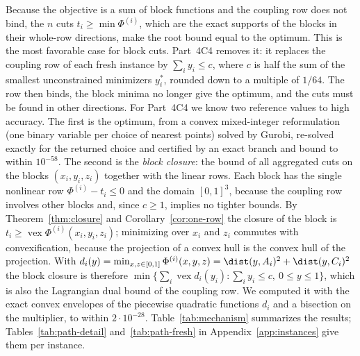 Because the objective is a sum of block functions and the coupling row does not
bind, the $n$ cuts $t_i\ge\min\Phi^{(i)}$, which are the exact supports of the
blocks in their whole-row directions, make the root bound equal to the
optimum. This is the most favorable case for block cuts. Part~4C4 removes it:
it replaces the coupling row of each fresh instance by $\sum_iy_i\le c$, where
$c$ is half the sum of the smallest unconstrained minimizers $y_i^\ast$, rounded
down to a multiple of $1/64$. The row then binds, the block minima no longer
give the optimum, and the cuts must be found in other directions. For Part~4C4
we know two reference values to high accuracy. The first is the optimum, from
a convex mixed-integer reformulation (one binary variable per choice of nearest
points) solved by Gurobi, re-solved exactly for the returned choice and
certified by an exact branch and bound to within $10^{-58}$. The second is the
\emph{block closure}: the bound of all aggregated cuts on the blocks
$(x_i,y_i,z_i)$ together with the linear rows. Each block has the single
nonlinear row $\Phi^{(i)}-t_i\le0$ and the domain $[0,1]^3$, because the coupling
row involves other blocks and, since $c\ge1$, implies no tighter bounds. By
Theorem~\ref{thm:closure} and Corollary~\ref{cor:one-row} the closure of the
block is $t_i\ge\operatorname{vex}\Phi^{(i)}(x_i,y_i,z_i)$; minimizing over $x_i$
and $z_i$ commutes with convexification, because the projection of a convex
hull is the convex hull of the projection. With
$d_i(y)=\min_{x,z\in[0,1]}\Phi^{(i)}(x,y,z)=\dist(y,A_i)^2+\dist(y,C_i)^2$ the
block closure is therefore
$\min\{\sum_i\operatorname{vex}d_i(y_i):\sum_iy_i\le c,\ 0\le y\le1\}$, which is
also the Lagrangian dual bound of the coupling row. We computed it with the
exact convex envelopes of the piecewise quadratic functions $d_i$ and a
bisection on the multiplier, to within $2\cdot10^{-28}$.
Table~\ref{tab:mechanism} summarizes the results; Tables~\ref{tab:path-detail}
and~\ref{tab:path-fresh} in Appendix~\ref{app:instances} give them per
instance.

